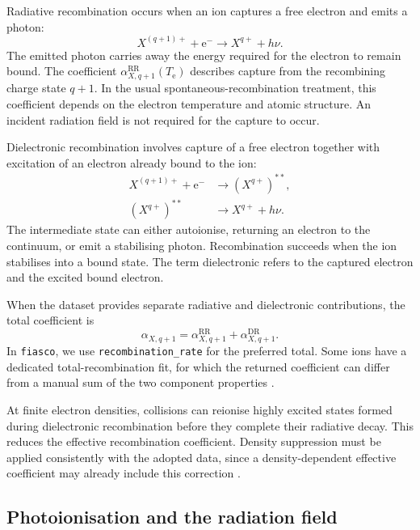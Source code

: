 Radiative recombination occurs when an ion captures a free electron and emits
a photon:
\begin{equation}
 X^{(q+1)+}+\mathrm e^-
 \longrightarrow X^{q+}+h\nu.
 \label{eq:ion_rr_reaction}
\end{equation}
The emitted photon carries away the energy required for the electron to remain
bound. The coefficient \(\alpha_{X,q+1}^{\mathrm{RR}}(T_{\mathrm e})\)
describes capture from the recombining charge state \(q+1\). In the usual
spontaneous-recombination treatment, this coefficient depends on the electron
temperature and atomic structure. An incident radiation field is not required
for the capture to occur.

Dielectronic recombination involves capture of a free electron together with
excitation of an electron already bound to the ion:
\begin{align}
 X^{(q+1)+}+\mathrm e^-
 &\longrightarrow (X^{q+})^{**},
 \nonumber\\
 (X^{q+})^{**}
 &\longrightarrow X^{q+}+h\nu.
 \label{eq:ion_dr_reaction}
\end{align}
The intermediate state can either autoionise, returning an electron to the
continuum, or emit a stabilising photon. Recombination succeeds when the ion
stabilises into a bound state. The term dielectronic refers to the captured
electron and the excited bound electron.

When the dataset provides separate radiative and dielectronic contributions,
the total coefficient is
\begin{equation}
 \alpha_{X,q+1}
 =\alpha_{X,q+1}^{\mathrm{RR}}
 +\alpha_{X,q+1}^{\mathrm{DR}}.
 \label{eq:ion_total_recombination}
\end{equation}
In \texttt{fiasco}, we use \texttt{recombination\_rate} for the preferred total.
Some ions have a dedicated total-recombination fit, for which the returned
coefficient can differ from a manual sum of the two component properties
\cite{fiasco_rates}.

At finite electron densities, collisions can reionise highly excited states
formed during dielectronic recombination before they complete their radiative
decay. This reduces the effective recombination coefficient. Density suppression
must be applied consistently with the adopted data, since a density-dependent
effective coefficient may already include this correction
\cite{nikolic2018}.

\subsection{Photoionisation and the radiation field}
\label{subsec:photoionisation}

